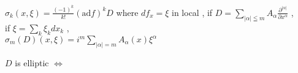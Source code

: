 \begin{Theorem}
\itemprop
  \(\sigma_k(x , \xi) = \frac{(-1)^k}{k !} (\text{ad} f)^k D\) where \(df_x = \xi\)
\itemprop
  in local ,
  if \(D = \sum_{\left| \alpha \right| \leqq m} A_{\alpha} \frac{\partial ^{\left| \alpha \right|}}{\partial x^{\alpha}}\) ,\\
  if \(\xi = \sum_k \xi_k dx_k\) ,\\
  \(\sigma_m(D)(x , \xi) = i^m \sum_{\left| \alpha \right| = m} A_{\alpha}(x)\xi^{\alpha}\)
\end{Theorem}

\begin{Definition}
\itemdefi
  \(D\) is elliptic \(\iff\) \WIP
\end{Definition}

\begin{Definition}
\itemdefi
\end{Definition}